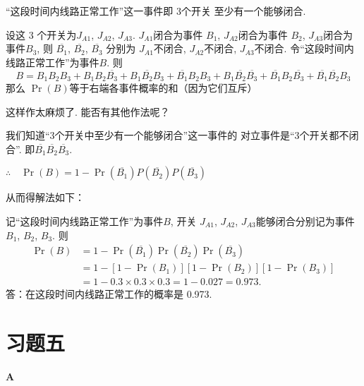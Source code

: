\begin{analyze}
“这段时间内线路正常工作”这一事件即 3个开关
至少有一个能够闭合.

设这 3 个开关为$J_{A1}$, $J_{A2}$, $J_{A3}.$
$J_{A1}$闭合为事件 $B_1$, $J_{A2}$闭合为事件 $B_2$, $J_{A3}$闭合为事件$B_{3}$, 则 $\overline{B_{1}}$, $\overline{B_{2}}$, $\overline{B_{3}}$ 分别为 $J_{A1}$不闭合, $J_{A2}$不闭合, $J_{A3}$不闭合. 令“这段时间内线路正常工作”为事件$B$.
则
$$B=B_{1}B_{2}B_{3}+B_{1}B_{2}\overline{B_{3}}+B_{1}\overline{B_{2}}B_{3}+\overline{B_{1}}B_{2}B_{3}+B_{1}\overline{B_{2}}\overline{B_{3}}+\overline{B_1}B_2\overline{B_3}+\overline{B_1}\overline{B_2}B_3$$
那么 $\Pr(B)$等于右端各事件概率的和（因为它们互斥）

这样作太麻烦了. 能否有其他作法呢？

我们知道“3个开关中至少有一个能够闭合”这一事件的
对立事件是“3个开关都不闭合”. 即$\overline{B_1}\overline{B_2}\overline{B_3}$.

$\therefore\quad \Pr( B) = 1- \Pr( \overline {B_{1}}) P( \overline {B_{2}}) P( \overline {B_{3}}) $

从而得解法如下：
\end{analyze}


\begin{solution}
记“这段时间内线路正常工作”为事件$B$, 开关 $J_{A1}$,
$J_{A2}$, $J_{A3}$能够闭合分别记为事件$B_1$, $B_2$, $B_3$. 则
\[\begin{split}
    \Pr(B)&=1-\Pr(\overline{B_1})\Pr(\overline{B_2})\Pr(\overline{B_3})\\
    &=1-[1-\Pr(B_1)][1-\Pr(B_2)][1-\Pr(B_3)]\\
    &=1-0.3\times0.3\times0.3=1-0.027=0.973.
\end{split}\]
答：在这段时间内线路正常工作的概率是 0.973.
\end{solution}


\section*{习题五}
\begin{center}
    \bfseries A
\end{center}

